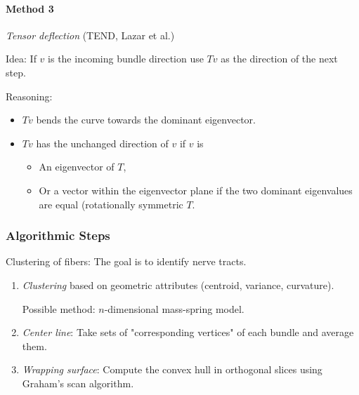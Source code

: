 \paragraph{Method 3} \emph{Tensor deflection} (TEND, Lazar et al.) 

Idea: If $v$ is the incoming bundle direction use $Tv$ as the direction of the next step.

Reasoning:
\begin{itemize}
    \item $Tv$ bends the curve towards the dominant eigenvector.
    \item $Tv$ has the unchanged direction of $v$ if $v$ is 
        \begin{itemize}
            \item An eigenvector of $T$,
            \item Or a vector within the eigenvector plane if the two dominant eigenvalues are equal (rotationally symmetric $T$.
        \end{itemize}
\end{itemize}


\subsubsection{Algorithmic Steps}
Clustering of fibers: The goal is to identify nerve tracts.

\begin{enumerate}
    \item \emph{Clustering} based on geometric attributes (centroid, variance, curvature).
    
    Possible method: $n$-dimensional mass-spring model.
    \item \emph{Center line}: Take sets of "corresponding vertices" of each bundle and average them.
    
    \item \emph{Wrapping surface}: Compute the convex hull in orthogonal slices using Graham's scan algorithm.
\end{enumerate}

































